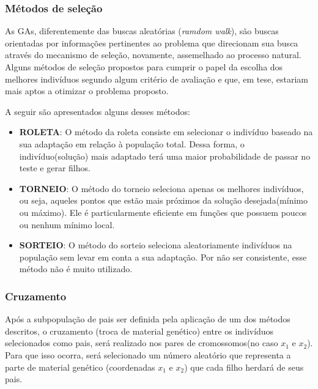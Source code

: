 \documentclass[a4paper,12pt]{article}
\begin{document}
\subsubsection{Métodos de seleção}
\label{metodo-selecao}

As GAs, diferentemente das buscas aleatórias (\emph{ramdom walk}), são buscas orientadas por informações pertinentes ao problema que direcionam sua busca através do mecanismo de seleção, novamente, assemelhado ao processo natural. Alguns métodos de seleção propostos para cumprir o papel da escolha dos melhores indivíduos segundo algum critério de avaliação e que, em tese, estariam mais aptos a otimizar o problema proposto. 

A seguir são apresentados alguns desses métodos:

\begin{itemize}

\item \textbf{ROLETA}: O método da roleta consiste em selecionar o indivíduo baseado na sua adaptação em relação à população total. Dessa forma, o indivíduo(solução) mais adaptado terá uma maior probabilidade de passar no teste e gerar filhos.

\item \textbf{TORNEIO}: O método do torneio seleciona apenas os melhores indivíduos, ou seja, aqueles pontos que estão mais próximos da solução desejada(mínimo ou máximo). Ele é particularmente eficiente em funções que possuem poucos ou nenhum mínimo local.

\item \textbf{SORTEIO}: O método do sorteio seleciona aleatoriamente indivíduos na população sem levar em conta a sua adaptação. Por não ser consistente, esse método não é muito utilizado.

\end{itemize}

\subsubsection{Cruzamento}
\label{cruzamento}

Após a subpopulação de pais ser definida pela aplicação de um dos métodos descritos, o cruzamento (troca de material genético) entre os indivíduos selecionados como pais, será realizado nos pares de cromossomos(no caso $x_1$ e $x_2$). Para que isso ocorra, será selecionado um número aleatório que representa a parte de material genético (coordenadas $x_1$ e $x_2$) que cada filho herdará de seus pais. 
\end{document}
